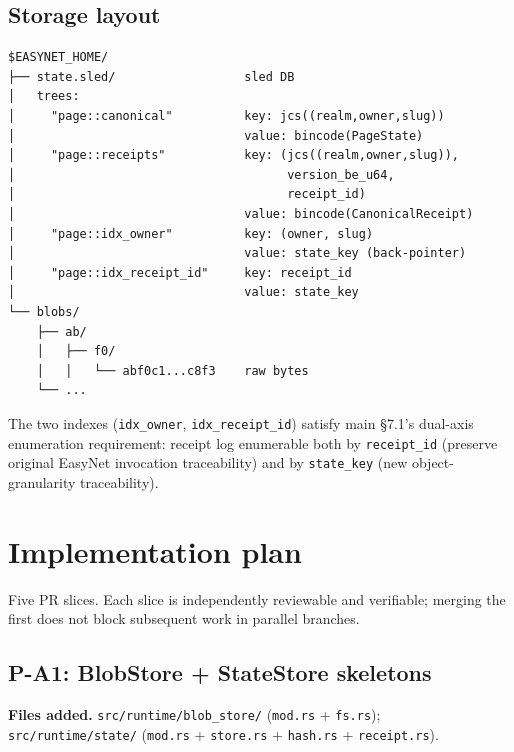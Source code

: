\documentclass[11pt,a4paper]{article}
\theoremstyle{definition}
\begin{document}
\subsection{Storage layout}
\label{sec:storage}

\begin{lstlisting}
$EASYNET_HOME/
├── state.sled/                  sled DB
│   trees:
│     "page::canonical"          key: jcs((realm,owner,slug))
│                                value: bincode(PageState)
│     "page::receipts"           key: (jcs((realm,owner,slug)),
│                                      version_be_u64,
│                                      receipt_id)
│                                value: bincode(CanonicalReceipt)
│     "page::idx_owner"          key: (owner, slug)
│                                value: state_key (back-pointer)
│     "page::idx_receipt_id"     key: receipt_id
│                                value: state_key
└── blobs/
    ├── ab/
    │   ├── f0/
    │   │   └── abf0c1...c8f3    raw bytes
    └── ...
\end{lstlisting}

The two indexes (\texttt{idx\_owner}, \texttt{idx\_receipt\_id})
satisfy main \S7.1's dual-axis enumeration requirement: receipt
log enumerable both by \texttt{receipt\_id} (preserve original
EasyNet invocation traceability) and by \texttt{state\_key}
(new object-granularity traceability).

\section{Implementation plan}
\label{sec:impl-plan}

Five PR slices. Each slice is independently reviewable and
verifiable; merging the first does not block subsequent work in
parallel branches.

\subsection{P-A1: BlobStore + StateStore skeletons}

\textbf{Files added.} \texttt{src/runtime/blob\_store/} (\texttt{mod.rs}
+ \texttt{fs.rs}); \texttt{src/runtime/state/} (\texttt{mod.rs} +
\texttt{store.rs} + \texttt{hash.rs} + \texttt{receipt.rs}).
\end{document}
